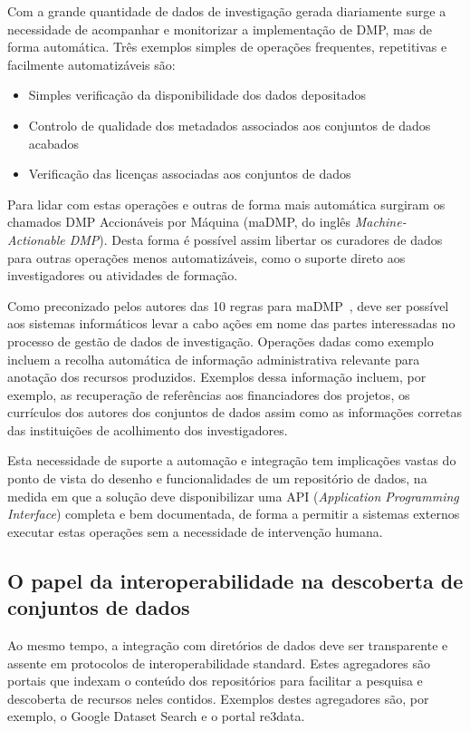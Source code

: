 \documentclass[sigconf,nonacm]{acmart}
\begin{document}
Com a grande quantidade de dados de investigação gerada diariamente surge a necessidade de acompanhar e monitorizar a implementação de DMP, mas de forma automática. Três exemplos simples de operações frequentes, repetitivas e facilmente automatizáveis são: 

\begin{itemize}
    \item Simples verificação da disponibilidade dos dados depositados
    \item Controlo de qualidade dos metadados associados aos conjuntos de dados acabados
    \item Verificação das licenças associadas aos conjuntos de dados
\end{itemize}

Para lidar com estas operações e outras de forma mais automática surgiram os chamados DMP Accionáveis por Máquina (maDMP, do inglês \textit{Machine-Actionable DMP}). Desta forma é possível assim libertar os curadores de dados para outras operações menos automatizáveis, como o suporte direto aos investigadores ou atividades de formação.

Como preconizado pelos autores das 10 regras para maDMP~\cite{miksa_tomasz_2018_1172673}, deve ser possível aos sistemas informáticos levar a cabo ações em nome das partes interessadas no processo de gestão de dados de investigação. Operações dadas como exemplo incluem a recolha automática de informação administrativa relevante para anotação dos recursos produzidos. Exemplos dessa informação incluem, por exemplo, as recuperação de referências aos financiadores dos projetos, os currículos dos autores dos conjuntos de dados assim como as informações corretas das instituições de acolhimento dos investigadores. 

Esta necessidade de suporte a automação e integração tem implicações vastas do ponto de vista do desenho e funcionalidades de um repositório de dados, na medida em que a solução deve disponibilizar uma API (\textit{Application Programming Interface}) completa e bem documentada, de forma a permitir a sistemas externos executar estas operações sem a necessidade de intervenção humana.

\subsection{O papel da interoperabilidade na descoberta de conjuntos de dados}

Ao mesmo tempo, a integração com diretórios de dados deve ser transparente e assente em protocolos de interoperabilidade standard. Estes agregadores são portais que indexam o conteúdo dos repositórios para facilitar a pesquisa e descoberta de recursos neles contidos. Exemplos destes agregadores são, por exemplo, o Google Dataset Search e o portal re3data. 
\end{document}
